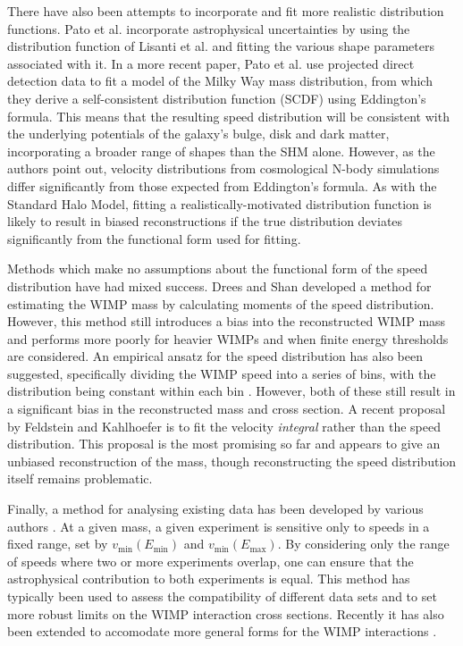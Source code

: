 There have also been attempts to incorporate and fit more realistic distribution functions. Pato et al. \cite{Pato:2011} incorporate astrophysical uncertainties by using the distribution function of Lisanti et al. \cite{Lisanti:2010} and fitting the various shape parameters associated with it. In a more recent paper, Pato et al. \cite{Pato:2013} use projected direct detection data to fit a model of the Milky Way mass distribution, from which they derive a self-consistent distribution function (SCDF) using Eddington's formula. This means that the resulting speed distribution will be consistent with the underlying potentials of the galaxy's bulge, disk and dark matter, incorporating a broader range of shapes than the SHM alone. However, as the authors point out, velocity distributions from cosmological N-body simulations differ significantly from those expected from Eddington's formula. As with the Standard Halo Model, fitting a realistically-motivated distribution function is likely to result in biased reconstructions if the true distribution deviates significantly from the functional form used for fitting.

Methods which make no assumptions about the functional form of the speed distribution have had mixed success. Drees and Shan \cite{Drees:2007, Drees:2008} developed a method for estimating the WIMP mass by calculating moments of the speed distribution. However, this method still introduces a bias into the reconstructed WIMP mass and performs more poorly for heavier WIMPs and when finite energy thresholds are considered. An empirical ansatz for the speed distribution has also been suggested, specifically dividing the WIMP speed into a series of bins, with the distribution being constant within each bin \cite{Peter:2011}. However, both of these still result in a significant bias in the reconstructed mass and cross section. A recent proposal by Feldstein and Kahlhoefer \cite{Feldstein:2014} is to fit the velocity \textit{integral} rather than the speed distribution. This proposal is the most promising so far and appears to give an unbiased reconstruction of the mass, though reconstructing the speed distribution itself remains problematic.

Finally, a method for analysing existing data has been developed by various authors \cite{Fox:2011b,Frandsen:2012, Gondolo:2012}. At a given mass, a given experiment is sensitive only to speeds in a fixed range, set by $v_\textrm{min}(E_\textrm{min})$ and $v_\textrm{min}(E_\textrm{max})$. By considering only the range of speeds where two or more experiments overlap, one can ensure that the astrophysical contribution to both experiments is equal. This method has typically been used to assess the compatibility of different data sets and to set more robust limits on the WIMP interaction cross sections. Recently it has also been extended to accomodate more general forms for the WIMP interactions \cite{DelNobile:2013}.

